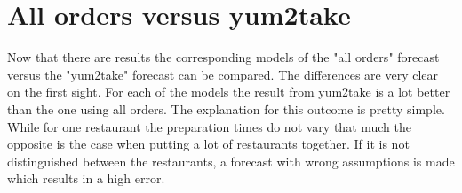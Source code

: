 \begin{table}[h]
\centering
\caption{Combination of Categorizations results for yum2take}
\label{Combination of Categorizations results for yum2take}
\end{table}

\section{All orders versus yum2take}\label{section:All orders versus yum2take}
Now that there are results the corresponding models of the "all orders" forecast versus the "yum2take" forecast can be compared. The differences are very clear on the first sight. For each of the models the result from yum2take is a lot better than the one using all orders. The explanation for this outcome is pretty simple. While for one restaurant the preparation times do not vary that much the opposite is the case when putting a lot of restaurants together. If it is not distinguished between the restaurants, a forecast with wrong assumptions is made which results in a high error.
